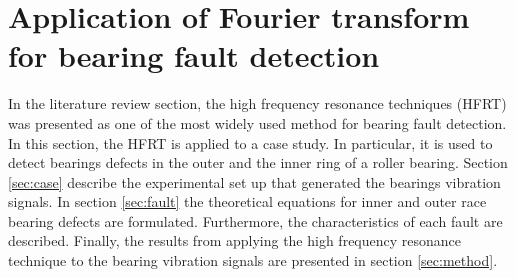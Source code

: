 \documentclass[../Main/thesis.tex]{subfiles}
\begin{document}
\section{Application of Fourier transform for bearing fault detection}
\label{sec:application}
In the literature review section, the high frequency resonance techniques (HFRT) was presented as one of the most widely used method for bearing fault detection. In this section, the HFRT is applied to a case study. In particular, it is used to detect bearings defects in the outer and the inner ring of a roller bearing.
\justify
Section \ref{sec:case} describe the experimental set up that generated the bearings vibration signals. In section \ref{sec:fault} the theoretical equations for inner and outer race bearing defects are formulated. Furthermore, the characteristics of each fault are described.
Finally, the results from applying the high frequency resonance technique to the bearing vibration signals are presented in section \ref{sec:method}.


\end{document}
